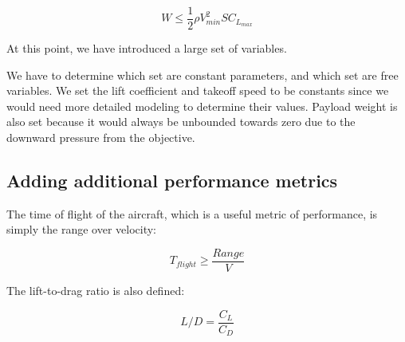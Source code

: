 \begin{equation}
    W \leq \frac{1}{2} \rho V_{min}^2 S C_{L_{max}}
\end{equation}

At this point, we have introduced a large set of variables.

We have to determine which set are constant parameters, and which set are free variables.
We set the lift coefficient and takeoff speed to be constants since we would need
more detailed modeling to determine their values. Payload weight is also set
because it would always be unbounded towards zero due to the downward pressure from
the objective.

\footnotesize
\centering
{}

\subsection{Adding additional performance metrics}

The time of flight of the aircraft, which is a useful metric of performance, is simply the range over velocity:

\begin{equation}
    T_{flight} \geq \frac{Range}{V}
\end{equation}

The lift-to-drag ratio is also defined: 

\begin{equation}
    L/D = \frac{C_L}{C_D}    
\end{equation}

